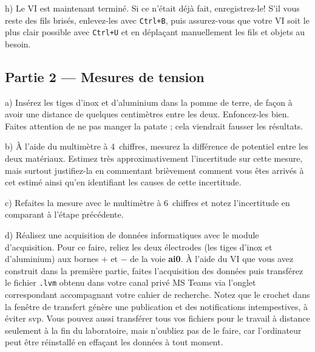 \documentclass[canadien,12pt,oneside,letterpaper]{article}
\begin{document}
h) Le VI est maintenant terminé. Si ce n'était déjà fait, enregistrez-le! S'il vous reste des fils brisés, enlevez-les avec \texttt{Ctrl+B}, puis assurez-vous que votre VI soit le plus clair possible avec \texttt{Ctrl+U} et en déplaçant manuellement les fils et objets au besoin.


\subsection{Partie 2 --- Mesures de tension}

a) Insérez les tiges d'inox et d'aluminium dans la pomme de terre, de façon à avoir une distance de quelques centimètres entre les deux. Enfoncez-les bien. Faites attention de ne pas manger la patate ; cela viendrait fausser les résultats.

b) À l'aide du multimètre à 4\textonehalf~chiffres, mesurez la différence de potentiel entre les deux matériaux. Estimez très approximativement l'incertitude sur cette mesure, mais surtout justifiez-la en commentant brièvement comment vous êtes arrivés à cet estimé ainsi qu'en identifiant les causes de cette incertitude. 

c) Refaites la mesure avec le multimètre à 6\textonehalf~chiffres et notez l'incertitude en comparant à l'étape précédente.

d) Réalisez une acquisition de données informatiques avec le module d'acquisition. Pour ce faire, reliez les deux électrodes (les tiges d'inox et d'aluminium) aux bornes $+$ et $-$ de la voie \textbf{ai0}. À l'aide du VI que vous avez construit dans la première partie, faites l'acquisition des données puis transférez le fichier \texttt{.lvm} obtenu dans votre canal privé MS Teams via l'onglet correspondant accompagnant votre cahier de recherche. Notez que le crochet dans la fenêtre de transfert génère une publication et des notifications intempestives, à éviter svp. Vous pouvez aussi transférer tous vos fichiers pour le travail à distance seulement à la fin du laboratoire, mais n'oubliez pas de le faire, car l'ordinateur peut être réinstallé en effaçant les données à tout moment.
\vspace{1ex}

\noindent{} 
\vspace{1ex}
\end{document}
